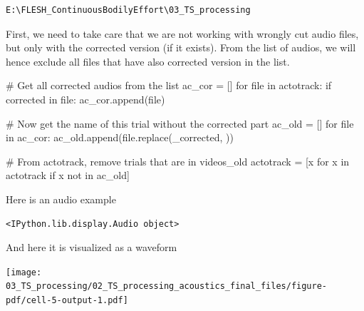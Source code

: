 \documentclass[
  letterpaper,
  DIV=11,
  numbers=noendperiod]{scrreprt}
\newenvironment{Shaded}{\begin{snugshade}}{\end{snugshade}}
\newcommand{\BuiltInTok}[1]{\textcolor[rgb]{0.00,0.23,0.31}{#1}}
\newcommand{\CommentTok}[1]{\textcolor[rgb]{0.37,0.37,0.37}{#1}}
\newcommand{\ControlFlowTok}[1]{\textcolor[rgb]{0.00,0.23,0.31}{#1}}
\newcommand{\KeywordTok}[1]{\textcolor[rgb]{0.00,0.23,0.31}{#1}}
\newcommand{\NormalTok}[1]{\textcolor[rgb]{0.00,0.23,0.31}{#1}}
\newcommand{\OperatorTok}[1]{\textcolor[rgb]{0.37,0.37,0.37}{#1}}
\newcommand{\StringTok}[1]{\textcolor[rgb]{0.13,0.47,0.30}{#1}}
\begin{document}
\begin{verbatim}
E:\FLESH_ContinuousBodilyEffort\03_TS_processing
\end{verbatim}

First, we need to take care that we are not working with wrongly cut
audio files, but only with the corrected version (if it exists). From
the list of audios, we will hence exclude all files that have also
corrected version in the list.

\begin{Shaded}
\begin{Highlighting}[]
\CommentTok{\# Get all corrected audios from the list}
\NormalTok{ac\_cor }\OperatorTok{=}\NormalTok{ []}
\ControlFlowTok{for} \BuiltInTok{file} \KeywordTok{in}\NormalTok{ actotrack:}
    \ControlFlowTok{if} \StringTok{\textquotesingle{}corrected\textquotesingle{}} \KeywordTok{in} \BuiltInTok{file}\NormalTok{:}
\NormalTok{        ac\_cor.append(}\BuiltInTok{file}\NormalTok{)}

\CommentTok{\# Now get the name of this trial without the corrected part}
\NormalTok{ac\_old }\OperatorTok{=}\NormalTok{ []}
\ControlFlowTok{for} \BuiltInTok{file} \KeywordTok{in}\NormalTok{ ac\_cor:}
\NormalTok{    ac\_old.append(}\BuiltInTok{file}\NormalTok{.replace(}\StringTok{\textquotesingle{}\_corrected\textquotesingle{}}\NormalTok{, }\StringTok{\textquotesingle{}\textquotesingle{}}\NormalTok{))}

\CommentTok{\# From actotrack, remove trials that are in videos\_old}
\NormalTok{actotrack }\OperatorTok{=}\NormalTok{ [x }\ControlFlowTok{for}\NormalTok{ x }\KeywordTok{in}\NormalTok{ actotrack }\ControlFlowTok{if}\NormalTok{ x }\KeywordTok{not} \KeywordTok{in}\NormalTok{ ac\_old]}
\end{Highlighting}
\end{Shaded}

Here is an audio example

\begin{verbatim}
<IPython.lib.display.Audio object>
\end{verbatim}

And here it is visualized as a waveform

\texttt{[image: 03\_TS\_processing/02\_TS\_processing\_acoustics\_final\_files/figure-pdf/cell-5-output-1.pdf]}
\end{document}
